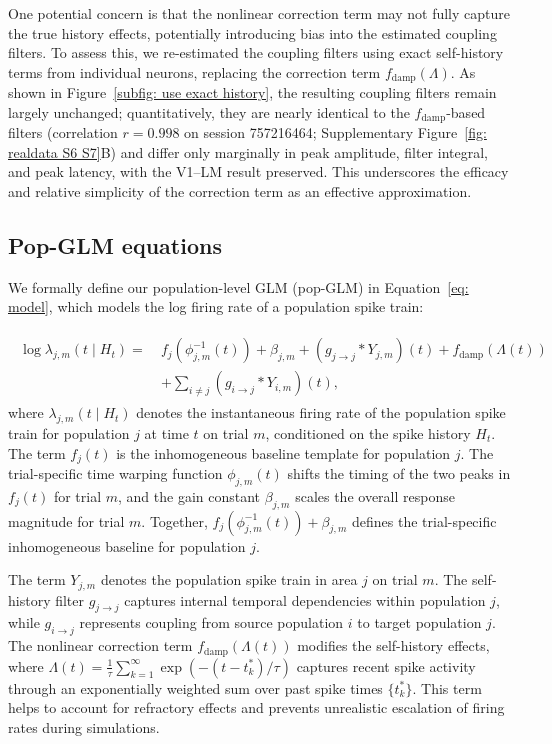 \documentclass[12pt]{article}
\begin{document}
One potential concern is that the nonlinear correction term may not fully capture the true history effects, potentially introducing bias into the estimated coupling filters. To assess this, we re-estimated the coupling filters using exact self-history terms from individual neurons, replacing the correction term $f_{\text{damp}}(\Lambda)$. As shown in Figure~\ref{subfig: use exact history}, the resulting coupling filters remain largely unchanged; quantitatively, they are nearly identical to the $f_{\text{damp}}$-based filters (correlation $r=0.998$ on session 757216464; Supplementary Figure~\ref{fig: realdata S6 S7}B) and differ only marginally in peak amplitude, filter integral, and peak latency, with the V1--LM result preserved. This underscores the efficacy and relative simplicity of the correction term as an effective approximation.

\subsection{Pop-GLM equations}

We formally define our population-level GLM (pop-GLM) in Equation~\ref{eq: model}, which models the log firing rate of a population spike train:

\begin{align}
\begin{split}
\log \lambda_{j, m} (t \mid H_t) = \ &f_j (\phi^{-1}_{j, m} (t)) + \beta_{j, m} + (g_{j \rightarrow j} * Y_{j, m})(t) + f_{\text{damp}}(\Lambda(t)) \\
&+ \sum_{i \neq j} (g_{i \rightarrow j} * Y_{i, m})(t),
\end{split}
\label{eq: model}
\end{align}
where $\lambda_{j, m}(t \mid H_t)$ denotes the instantaneous firing rate of the population spike train for population $j$ at time $t$ on trial $m$, conditioned on the spike history $H_t$. The term $f_j(t)$ is the inhomogeneous baseline template for population $j$. The trial-specific time warping function $\phi_{j, m}(t)$ shifts the timing of the two peaks in $f_j(t)$ for trial $m$, and the gain constant $\beta_{j, m}$ scales the overall response magnitude for trial $m$. Together, $f_j(\phi^{-1}_{j, m}(t)) + \beta_{j, m}$ defines the trial-specific inhomogeneous baseline for population $j$.

The term $Y_{j, m}$ denotes the population spike train in area $j$ on trial $m$. The self-history filter $g_{j \rightarrow j}$ captures internal temporal dependencies within population $j$, while $g_{i \rightarrow j}$ represents coupling from source population $i$ to target population $j$. The nonlinear correction term $f_{\text{damp}}(\Lambda(t))$ modifies the self-history effects, where $\Lambda(t) = \frac{1}{\tau}\sum_{k=1}^\infty \exp(-(t - t_k^*)/\tau)$ captures recent spike activity through an exponentially weighted sum over past spike times $\{t_k^*\}$. This term helps to account for refractory effects and prevents unrealistic escalation of firing rates during simulations.
\end{document}
